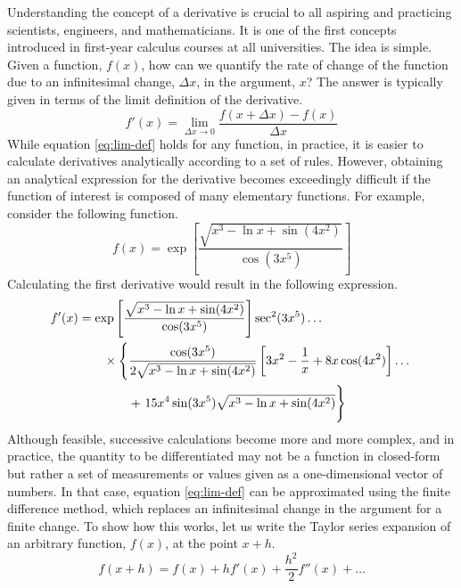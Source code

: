 Understanding the concept of a derivative is crucial to all aspiring and 
practicing scientists, engineers, and mathematicians. It is one of the first
concepts introduced in first-year calculus courses at all universities. The 
idea is simple. Given a function, $f(x)$, how can we quantify the rate of 
change of the function due to an infinitesimal change, $\Delta x$, in the 
argument, $x$? The answer is typically given in terms of the limit 
definition of the derivative.
\begin{equation}
    f'(x) = \lim_{\Delta x\rightarrow 0} \frac{f(x+\Delta x)-f(x)}{\Delta x}
    \label{eq:lim-def}
\end{equation}
While equation \eqref{eq:lim-def} holds for any function, in practice, it is
easier to calculate derivatives analytically according to a set of rules. 
However, obtaining an analytical expression for the derivative becomes 
exceedingly difficult if the function of interest is composed of many 
elementary functions. For example, consider the following function.
\begin{equation}
    f(x) = \exp\left[\frac{\sqrt{x^3 - \ln x + \sin(4x^2)}}{\cos(3x^5)}\right]
    \label{eq:ugly-eq}
\end{equation}
Calculating the first derivative would result in the following expression.
\begin{align}
    f'(x) &= \exp\left[\frac{\sqrt{x^3 - \ln x + \sin(4x^2)}}{\cos(3x^5)}\right]
    \sec^2(3x^5)\dots\nonumber\\
    &\qquad\times\left\{
    \frac{\cos(3x^5)}{2\sqrt{x^3 - \ln x + \sin(4x^2)}}
    \left[3x^2-\frac{1}{x}+8x\cos(4x^2)\right]\dots\right.\nonumber\\
    &\qquad\qquad+
    \left.\vphantom{\frac{\cos(3x^5)}{2\sqrt{x^3 - \ln x + \sin(4x^2)}}}
    15x^4\sin(3x^5)\sqrt{x^3 - \ln x + \sin(4x^2)}
    \right\}
\end{align}
Although feasible, successive calculations become more and more complex, and
in practice, the quantity to be differentiated may not be a function in 
closed-form but rather a set of measurements or values given as a 
one-dimensional vector of numbers. In that case, equation \eqref{eq:lim-def}
can be approximated using the finite difference method, which replaces an 
infinitesimal change in the argument for a finite change. To show how this 
works, let us write the Taylor series expansion of an arbitrary function, 
$f(x)$, at the point $x+h$.
\begin{equation}
    f(x+h) = f(x) + hf'(x) + \frac{h^2}{2}f''(x) + \dots
    \label{eq:f-tay}
\end{equation}
